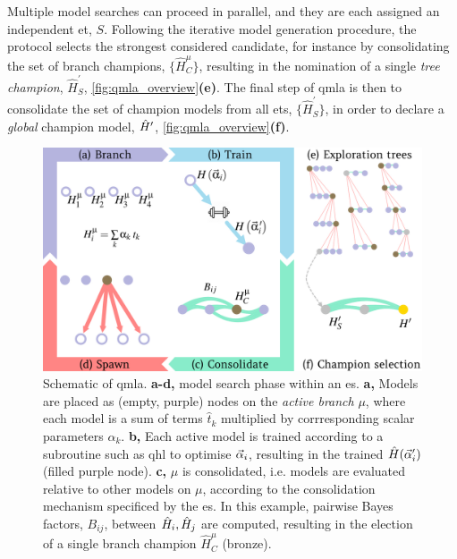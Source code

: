 Multiple model searches can proceed in parallel, and they are each assigned an independent \gls{et}, $S$. 
Following the iterative model generation procedure, the protocol selects the strongest considered candidate,
    for instance by consolidating the set of branch champions, $\{\hat{H}_C^{\mu} \}$,
    resulting in the nomination of a single \emph{tree champion}, $\hat{H}_{S}^{\prime}$, \cref{fig:qmla_overview}\textbf{(e)}.
The final step of \gls{qmla} is then to consolidate the set of champion models from all \glspl{et}, $\{\hat{H}_{S}^{\prime} \}$, 
    in order to declare a \emph{global} \gls{champion model}, $\hat{H}^{\prime}$, \cref{fig:qmla_overview}\textbf{(f)}. 

\begin{figure}[t!]
    \begin{center}
        \includegraphics{algorithms/figures/overview.jpg}
    \end{center}
    \caption[Quantum Model Learning Agent overview]{
        Schematic of \acrfull{qmla}. 
        \textbf{a-d,} \Gls{model search} phase within an \acrfull{es}.
        \textbf{a,} Models are placed as (empty, purple) nodes on the \emph{active branch} $\mu$, 
            where each model is a sum of terms $\hat{t}_k$ multiplied by corrresponding scalar parameters $\alpha_k$. 
        \textbf{b,} Each active model is trained according to a subroutine such as 
            \acrlong{qhl} to optimise $\vec{\alpha}_i$, 
            resulting in the trained $\hat{H}(\vec{\alpha}_i^{\prime})$ (filled purple node). 
        \textbf{c,} $\mu$ is consolidated, i.e. models are evaluated relative to other
            models on $\mu$, according to the consolidation mechanism specificed by the \gls{es}.
            In this example, pairwise Bayes factors, $B_{ij}$, between $\hat{H}_i, \hat{H}_j$ are computed, 
            resulting in the election of a single branch champion $\hat{H}_C^{\mu}$ (bronze). 
}
\end{figure}

